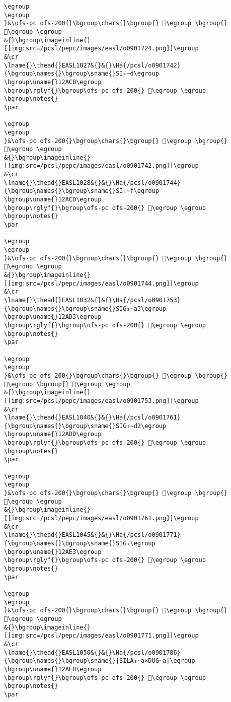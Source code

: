 \begin{verbatim}
\egroup
\egroup
}&\ofs-pc ofs-200{}\bgroup\chars{}\bgroup{} 𒫄\egroup \bgroup{} 𒫇\egroup \egroup
&{}\bgroup\imageinline{}[[img:src=/pcsl/pepc/images/easl/o0901724.png]]\egroup
&\cr
\lname{}\thead{}EASL1027&{}&{}\Ha{/pcsl/o0901742}{\bgroup\names{}\bgroup\sname{}SI₄∼d\egroup
\bgroup\uname{}12ACB\egroup
\bgroup\rglyf{}\bgroup\ofs-pc ofs-200{} 𒫋\egroup \egroup
\bgroup\notes{}
\par 

\egroup
\egroup
}&\ofs-pc ofs-200{}\bgroup\chars{}\bgroup{} 𒫋\egroup \bgroup{} 𒫌\egroup \egroup
&{}\bgroup\imageinline{}[[img:src=/pcsl/pepc/images/easl/o0901742.png]]\egroup
&\cr
\lname{}\thead{}EASL1028&{}&{}\Ha{/pcsl/o0901744}{\bgroup\names{}\bgroup\sname{}SI₄∼f\egroup
\bgroup\uname{}12ACD\egroup
\bgroup\rglyf{}\bgroup\ofs-pc ofs-200{} 𒫍\egroup \egroup
\bgroup\notes{}
\par 

\egroup
\egroup
}&\ofs-pc ofs-200{}\bgroup\chars{}\bgroup{} 𒫍\egroup \bgroup{} 𒫎\egroup \egroup
&{}\bgroup\imageinline{}[[img:src=/pcsl/pepc/images/easl/o0901744.png]]\egroup
&\cr
\lname{}\thead{}EASL1032&{}&{}\Ha{/pcsl/o0901753}{\bgroup\names{}\bgroup\sname{}SIG₂∼a3\egroup
\bgroup\uname{}12AD3\egroup
\bgroup\rglyf{}\bgroup\ofs-pc ofs-200{} 𒫓\egroup \egroup
\bgroup\notes{}
\par 

\egroup
\egroup
}&\ofs-pc ofs-200{}\bgroup\chars{}\bgroup{} 𒫓\egroup \bgroup{} 𒫔\egroup \bgroup{} 𒫕\egroup \egroup
&{}\bgroup\imageinline{}[[img:src=/pcsl/pepc/images/easl/o0901753.png]]\egroup
&\cr
\lname{}\thead{}EASL1040&{}&{}\Ha{/pcsl/o0901761}{\bgroup\names{}\bgroup\sname{}SIG₂∼d2\egroup
\bgroup\uname{}12ADD\egroup
\bgroup\rglyf{}\bgroup\ofs-pc ofs-200{} 𒫝\egroup \egroup
\bgroup\notes{}
\par 

\egroup
\egroup
}&\ofs-pc ofs-200{}\bgroup\chars{}\bgroup{} 𒫝\egroup \bgroup{} 𒫞\egroup \egroup
&{}\bgroup\imageinline{}[[img:src=/pcsl/pepc/images/easl/o0901761.png]]\egroup
&\cr
\lname{}\thead{}EASL1045&{}&{}\Ha{/pcsl/o0901771}{\bgroup\names{}\bgroup\sname{}SIG₇\egroup
\bgroup\uname{}12AE3\egroup
\bgroup\rglyf{}\bgroup\ofs-pc ofs-200{} 𒫣\egroup \egroup
\bgroup\notes{}
\par 

\egroup
\egroup
}&\ofs-pc ofs-200{}\bgroup\chars{}\bgroup{} 𒫣\egroup \bgroup{} 𒫤\egroup \egroup
&{}\bgroup\imageinline{}[[img:src=/pcsl/pepc/images/easl/o0901771.png]]\egroup
&\cr
\lname{}\thead{}EASL1050&{}&{}\Ha{/pcsl/o0901786}{\bgroup\names{}\bgroup\sname{}|SILA₃∼a×DUG∼a|\egroup
\bgroup\uname{}12AE8\egroup
\bgroup\rglyf{}\bgroup\ofs-pc ofs-200{} 𒫨\egroup \egroup
\bgroup\notes{}
\par 


\end{verbatim}
